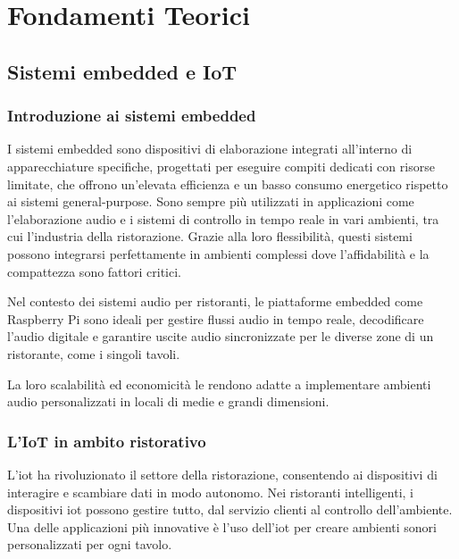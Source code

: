 
%

\chapter{Fondamenti Teorici}


\section{Sistemi embedded e IoT}

\subsection{Introduzione ai sistemi embedded}
\noindent

I sistemi embedded sono dispositivi di elaborazione integrati all'interno di apparecchiature specifiche, progettati per eseguire compiti dedicati con risorse limitate, che offrono un'elevata efficienza e un basso consumo energetico rispetto ai sistemi general-purpose. Sono sempre più utilizzati in applicazioni come l'elaborazione audio e i sistemi di controllo in tempo reale in vari ambienti, tra cui l'industria della ristorazione. Grazie alla loro flessibilità, questi sistemi possono integrarsi perfettamente in ambienti complessi dove l'affidabilità e la compattezza sono fattori critici.

Nel contesto dei sistemi audio per ristoranti, le piattaforme embedded come Raspberry Pi sono ideali per gestire flussi audio in tempo reale, decodificare l'audio digitale e garantire uscite audio sincronizzate per le diverse zone di un ristorante, come i singoli tavoli.

La loro scalabilità ed economicità le rendono adatte a implementare ambienti audio personalizzati in locali di medie e grandi dimensioni.


\subsection{L'IoT in ambito ristorativo}
\noindent

L'\gls{iot} ha rivoluzionato il settore della ristorazione, consentendo ai dispositivi di interagire e scambiare dati in modo autonomo. Nei ristoranti intelligenti, i dispositivi \gls{iot} possono gestire tutto, dal servizio clienti al controllo dell'ambiente. Una delle applicazioni più innovative è l'uso dell'\gls{iot} per creare ambienti sonori personalizzati per ogni tavolo.

